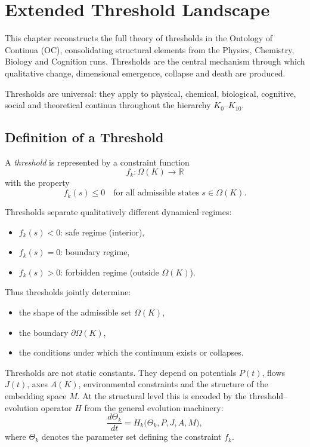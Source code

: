 
\section{Extended Threshold Landscape}
\label{sec:thresholds-extended}

This chapter reconstructs the full theory of thresholds in the Ontology of
Continua (OC), consolidating structural elements from the Physics, Chemistry,
Biology and Cognition runs. Thresholds are the central mechanism through which
qualitative change, dimensional emergence, collapse and death are produced.

Thresholds are universal: they apply to physical, chemical, biological,
cognitive, social and theoretical continua throughout the hierarchy
\(K_0\)–\(K_{10}\).

\subsection{Definition of a Threshold}

A \emph{threshold} is represented by a constraint function
\[
   f_k : \Omega(K) \rightarrow \mathbb{R}
\]
with the property
\[
   f_k(s) \le 0
   \quad\text{for all admissible states } s\in\Omega(K).
\]

Thresholds separate qualitatively different dynamical regimes:
\begin{itemize}
    \item \( f_k(s) < 0 \): safe regime (interior),
    \item \( f_k(s) = 0 \): boundary regime,
    \item \( f_k(s) > 0 \): forbidden regime (outside \(\Omega(K)\)).
\end{itemize}

Thus thresholds jointly determine:
\begin{itemize}
    \item the shape of the admissible set \(\Omega(K)\),
    \item the boundary \(\partial\Omega(K)\),
    \item the conditions under which the continuum exists or collapses.
\end{itemize}

Thresholds are not static constants.
They depend on potentials \(P(t)\), flows \(J(t)\), axes \(A(K)\), environmental
constraints and the structure of the embedding space \(M\).
At the structural level this is encoded by the threshold–evolution operator
\(H\) from the general evolution machinery:
\[
  \frac{d\Theta_k}{dt}
   = H_k\big(\Theta_k, P, J, A, M\big),
\]
where \(\Theta_k\) denotes the parameter set defining the constraint \(f_k\).

